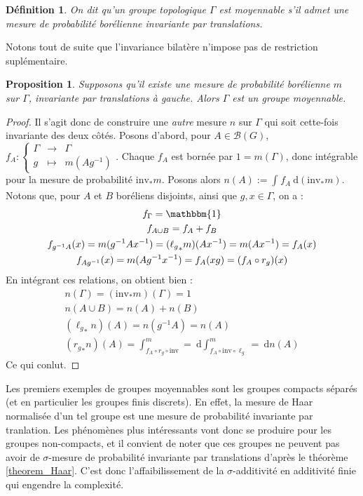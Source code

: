 \documentclass[a4paper,12pt]{article}
\newtheorem{proposition}[theorem]{Proposition}
\newtheorem{definition}[theorem]{Définition}
\newcommand{\Bor}{\mathcal{B}}
\newcommand{\indic}{\mathbbm{1}}
\newcommand{\integral}[4]{\int_{#1}^{#2} #3~\mathrm{d}#4}
\newcommand\fundef[3]{#1: \left\{\begin{array}{ccc}#2\\#3\end{array}\right.}
\newcommand{\inv}{^{-1}}
\newcommand{\comp}{\circ}
\newcommand{\invop}{\mathrm{inv}}
\begin{document}
\begin{definition}
    On dit qu'un groupe topologique $\Gamma$ est \emph{moyennable} s'il admet une 
    mesure de probabilité borélienne invariante par translations.
\end{definition}

Notons tout de suite que l'invariance bilatère n'impose pas de restriction suplémentaire. 
\begin{proposition}\label{bilateral_of_left}
    Supposons qu'il existe une mesure de probabilité borélienne $m$ sur $\Gamma$, invariante par translations \emph{à gauche}.
    Alors $\Gamma$ est un groupe moyennable.
\end{proposition} 

\begin{proof}
    Il s'agit donc de construire une \emph{autre} mesure $n$ sur $\Gamma$ qui soit cette-fois invariante des deux côtés.
    Posons d'abord, pour $A\in\Bor(G)$, $\fundef{f_A}{\Gamma&\to& \Gamma}{g&\mapsto& m(Ag\inv)}$. Chaque $f_A$ est bornée par $1 = m(\Gamma)$, 
    donc intégrable pour la mesure de probabilité $\invop_*m$. Posons alors $n(A) := \integral{}{}{f_A}{(\invop_*m)}$. \\
    Notons que, pour $A$ et $B$ boréliens disjoints, ainsi que $g, x\in\Gamma$, on a :
    \begin{gather*}
        f_\Gamma = \indic \\
        f_{A\cup B} = f_A + f_B \\
        f_{g\inv A}(x) = m(g\inv Ax\inv) = ({\ell_g}_*m)(Ax\inv) = m(Ax\inv) = f_A(x) \\
        f_{Ag\inv}(x) = m(Ag\inv x\inv) = f_A(xg) = (f_A \comp r_g)(x)
    \end{gather*}
    En intégrant ces relations, on obtient bien :
    \begin{gather*}
        n(\Gamma) = (\invop_*m)(\Gamma) = 1 \\
        n(A\cup B) = n(A) + n(B) \\
        ({\ell_g}_*n)(A) = n(g\inv A) = n(A) \\
        ({r_g}_*n)(A) = \integral{f_A\comp r_g\comp\invop}{m} = \integral{f_A\comp\invop\comp \ell_g}{m} = n(A)
    \end{gather*}
    Ce qui conlut.
\end{proof}

Les premiers exemples de groupes moyennables sont les groupes compacts séparés (et en particulier les groupes finis discrets).
En effet, la mesure de Haar normalisée d'un tel groupe est une mesure de probabilité invariante par tranlation. Les phénomènes
plus intéressants vont donc se produire pour les groupes non-compacts, et il convient de noter que ces groupes ne peuvent pas avoir
de $\sigma$-mesure de probabilité invariante par translations d'après le théorème \ref{theorem_Haar}. C'est donc l'affaibilissement de la 
$\sigma$-additivité en additivité finie qui engendre la complexité. 
\end{document}
